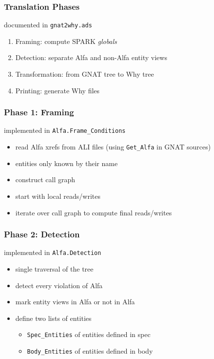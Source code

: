 \documentclass{beamer}
\newcommand{\vs}{\vspace{0.5cm}}
\newenvironment{specialframe}{%
  \begin{frame}[fragile,environment=specialframe]}{\end{frame}}
\begin{document}
\begin{specialframe}\frametitle{Translation Phases}

  documented in \verb|gnat2why.ads|

  \vs

  \begin{enumerate}
  \item Framing: compute SPARK \emph{globals}
  \item Detection: separate Alfa and non-Alfa entity views
  \item Transformation: from GNAT tree to Why tree
  \item Printing: generate Why files
  \end{enumerate}
\end{specialframe}

\begin{specialframe}\frametitle{Phase 1: Framing}

  implemented in \verb|Alfa.Frame_Conditions|

  \vs

  \begin{itemize}
  \item read Alfa xrefs from ALI files (using \verb|Get_Alfa| in GNAT sources)
  \item entities only known by their name
  \item construct call graph
  \item start with local reads/writes
  \item iterate over call graph to compute final reads/writes
  \end{itemize}
\end{specialframe}

\begin{specialframe}\frametitle{Phase 2: Detection}

  implemented in \verb|Alfa.Detection|

  \vs

  \begin{itemize}
  \item single traversal of the tree
  \item detect every violation of Alfa
  \item mark entity views in Alfa or not in Alfa
  \item define two lists of entities
    \begin{itemize}
    \item \verb|Spec_Entities| of entities defined in spec
    \item \verb|Body_Entities| of entities defined in body
    \end{itemize}
  \end{itemize}
\end{specialframe}
\end{document}
